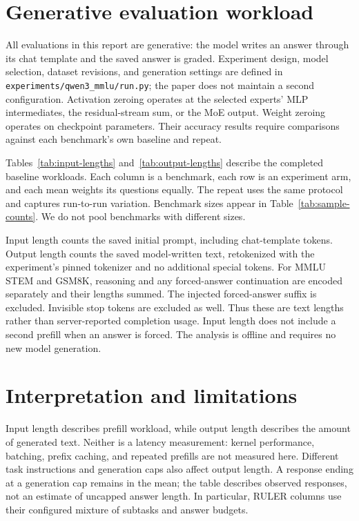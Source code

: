 \section{Generative evaluation workload}
All evaluations in this report are generative: the model writes an answer
through its chat template and the saved answer is graded. Experiment design,
model selection, dataset revisions, and generation settings are defined in
\texttt{experiments/qwen3\_mmlu/run.py}; the paper does not maintain a second
configuration. Activation zeroing operates at the selected experts' MLP
intermediates, the residual-stream sum, or the MoE output. Weight zeroing
operates on checkpoint parameters. Their accuracy results require comparisons
against each benchmark's own baseline and repeat.

Tables~\ref{tab:input-lengths} and~\ref{tab:output-lengths} describe the
completed baseline workloads. Each column is a benchmark, each row is an
experiment arm, and each mean weights its questions equally. The repeat uses
the same protocol and captures run-to-run variation. Benchmark sizes appear in
Table~\ref{tab:sample-counts}. We do not pool benchmarks with different sizes.

Input length counts the saved initial prompt, including chat-template tokens.
Output length counts the saved model-written text, retokenized with the
experiment's pinned tokenizer and no additional special tokens. For MMLU STEM
and GSM8K, reasoning and any forced-answer continuation are encoded separately
and their lengths summed. The injected forced-answer suffix is excluded.
Invisible stop tokens are excluded as well. Thus these are text lengths rather
than server-reported completion usage. Input length does not include a second
prefill when an answer is forced. The analysis is offline and requires no new
model generation.

\begin{table}[ht]
\centering
\caption{Mean initial input length in tokens.}
\label{tab:input-lengths}

\end{table}
\begin{table}[ht]
\centering
\caption{Mean model-written output text length in tokens.}
\label{tab:output-lengths}

\end{table}

\section{Interpretation and limitations}
Input length describes prefill workload, while output length describes the
amount of generated text. Neither is a latency measurement: kernel performance,
batching, prefix caching, and repeated prefills are not measured here.
Different task instructions and generation caps also affect output length.
A response ending at a generation cap remains in the mean; the table describes
observed responses, not an estimate of uncapped answer length. In particular,
RULER columns use their configured mixture of subtasks and answer budgets.
